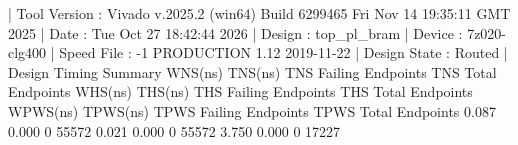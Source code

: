 \begin{codeblock}
| Tool Version : Vivado v.2025.2 (win64) Build 6299465 Fri Nov 14 19:35:11 GMT 2025
| Date         : Tue Oct 27 18:42:44 2026
| Design       : top_pl_bram
| Device       : 7z020-clg400
| Speed File   : -1  PRODUCTION 1.12 2019-11-22
| Design State : Routed
| Design Timing Summary
    WNS(ns)      TNS(ns)  TNS Failing Endpoints  TNS Total Endpoints      WHS(ns)      THS(ns)  THS Failing Endpoints  THS Total Endpoints     WPWS(ns)     TPWS(ns)  TPWS Failing Endpoints  TPWS Total Endpoints  
      0.087        0.000                      0                55572        0.021        0.000                      0                55572        3.750        0.000                       0                 17227
\end{codeblock}

